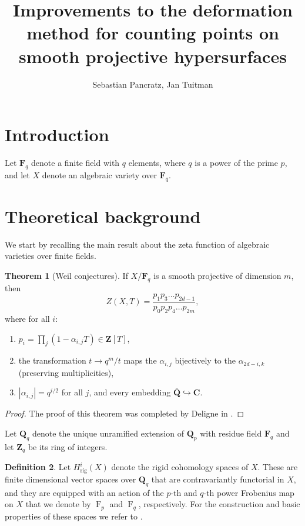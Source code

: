\documentclass[a4paper,11pt]{article}
\author{Sebastian Pancratz, Jan Tuitman}
\title{Improvements to the deformation method for counting points on smooth projective hypersurfaces}
\numberwithin{equation}{section}
\newcommand{\ZZ}{\mathbf{Z}} %
\newcommand{\QQ}{\mathbf{Q}} %
\newcommand{\CC}{\mathbf{C}} %
\newcommand{\FF}{\mathbf{F}} %
\DeclareMathOperator{\Frob}{F}           %
\providecommand{\Hrig}{H_{\text{rig}}}  %
\theoremstyle{definition}
\newtheorem{thm}{Theorem}[section]
\newtheorem{defn}[thm]{Definition}
\begin{document}
\maketitle

\tableofcontents


\section{Introduction}
\label{sec:Introduction}

Let $\FF_q$ denote a finite field with $q$ elements, where $q$ is a power of the prime $p$, 
and let $X$ denote an algebraic variety over $\FF_q$.

\section{Theoretical background}
\label{sec:Background}

We start by recalling the main result about the zeta function of algebraic
varieties over finite fields.

\begin{thm}[Weil conjectures] If $X/\FF_q$ is a smooth projective of dimension $m$, 
then \label{thm:weildeligne}
\[
Z(X,T)=\frac{p_1 p_3 \ldots p_{2d-1}}{p_0 p_2 p_4 \ldots p_{2m}},
\]
where for all $i$:
\begin{enumerate}
\item $p_i = \prod_j (1-\alpha_{i,j}T) \in \ZZ[T]$,
\item the transformation $t \rightarrow q^m/t$ maps the $\alpha_{i,j}$ bijectively to 
      the $\alpha_{2d-i,k}$ (preserving multiplicities),
\item $|\alpha_{i,j}| = q^{i/2}$ for all $j$, and every embedding $\overline{\QQ} \hookrightarrow \CC$. 
\end{enumerate}
\end{thm}

\begin{proof}
The proof of this theorem was completed by Deligne in \cite{Deligne1974}.
\end{proof}

Let $\QQ_q$ denote the unique unramified extension of $\QQ_p$ with residue field $\FF_q$ and let
$\ZZ_q$ be its ring of integers.

\begin{defn}
Let $\Hrig^{i}(X)$ denote the rigid
cohomology spaces of $X$. These are finite dimensional vector spaces over $\QQ_q$ 
that are contravariantly functorial in $X$, and they are equipped with an action of 
the $p$-th and $q$-th power Frobenius map on $X$ that we denote by $\Frob_p$ 
and $\Frob_q$, respectively. For the construction and basic properties of these spaces we 
refer to \cite{Berthelot1986}.
\end{defn}
\end{document}
